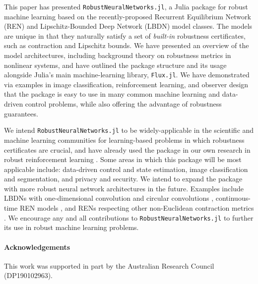 This paper has presented \verb|RobustNeuralNetworks.jl|, a Julia package for robust machine learning based on the recently-proposed Recurrent Equilibrium Network (REN) and Lipschitz-Bounded Deep Network (LBDN) model classes. The models are unique in that they naturally satisfy a set of \textit{built-in} robustness certificates, such as contraction and Lipschitz bounds. We have presented an overview of the model architectures, including background theory on robustness metrics in nonlinear systems, and have outlined the package structure and its usage alongside Julia's main machine-learning library, \verb|Flux.jl|. We have demonstrated via examples in image classification, reinforcement learning, and observer design that the package is easy to use in many common machine learning and data-driven control problems, while also offering the advantage of robustness guarantees.

We intend \verb|RobustNeuralNetworks.jl| to be widely-applicable in the scientific and machine learning communities for learning-based problems in which robustness certificates are crucial, and have already used the package in our own research in robust reinforcement learning \cite{Barbara++2023}. Some areas in which this package will be most applicable include: data-driven control and state estimation, image classification and segmentation, and privacy and security. We intend to expand the package with more robust neural network architectures in the future. Examples include LBDNs with one-dimensional convolution \cite{Pauli++2022c} and circular convolutions \cite{Wang+Manchester2023}, continuous-time REN models \cite{Martinelli++2023}, and RENs respecting other non-Euclidean contraction metrics \cite{Davydov++2022}. We encourage any and all contributions to \verb|RobustNeuralNetworks.jl| to further its use in robust machine learning problems.

\paragraph*{Acknowledgements}
This work was supported in part by the Australian Research Council (DP190102963).
